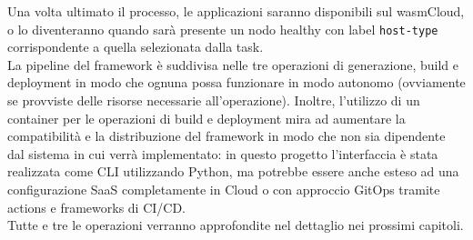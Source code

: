 Una volta ultimato il processo, le applicazioni saranno disponibili sul wasmCloud, o lo diventeranno quando sarà presente un nodo healthy con label \texttt{host-type} corrispondente a quella selezionata dalla task.\\
La pipeline del framework è suddivisa nelle tre operazioni di generazione, build e deployment in modo che ognuna possa funzionare in modo autonomo (ovviamente se provviste delle risorse necessarie all'operazione). Inoltre, l'utilizzo di un container per le operazioni di build e deployment mira ad aumentare la compatibilità e la distribuzione del framework in modo che non sia dipendente dal sistema in cui verrà implementato: in questo progetto l'interfaccia è stata realizzata come CLI utilizzando Python, ma potrebbe essere anche esteso ad una configurazione SaaS completamente in Cloud o con approccio GitOps tramite actions e frameworks di CI/CD.\\
Tutte e tre le operazioni verranno approfondite nel dettaglio nei prossimi capitoli.